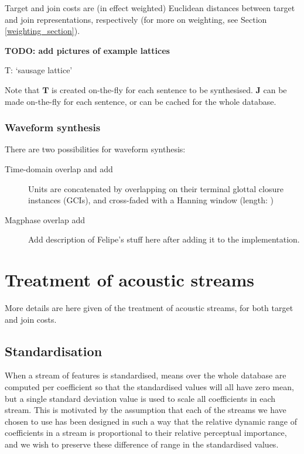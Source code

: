Target and join costs are (in effect weighted) Euclidean distances between target and join representations, respectively (for more on weighting, see Section \ref{weighting_section}).

\color{red}

\textbf{TODO: add pictures of example lattices}

T: `sausage lattice'

\color{black}

Note that $\bm{T}$ is created on-the-fly for each sentence to be synthesised. $\bm{J}$ can be made on-the-fly for each sentence, or can be cached for the whole database.

 
\subsubsection{Waveform synthesis}

There are two possibilities for waveform synthesis:

\begin{description}
    \item[Time-domain overlap and add] Units are concatenated by overlapping on their terminal glottal closure instances (GCIs), and cross-faded with a Hanning window (length: )
    \item[Magphase overlap add] \color{red} Add description of Felipe's stuff here after adding it to the implementation. \color{black}
\end{description}



\section{Treatment of acoustic streams} 

More details are here given of the treatment of acoustic streams, for both target and join costs. 

\subsection{Standardisation}\label{standardisation_section}

When a stream of features is standardised, means over the whole database are computed per coefficient so that the standardised values will all have zero mean, but a single standard deviation value is used to scale all coefficients in each stream. This is motivated by the assumption that each of the streams we have chosen to use has been designed in such a way that the relative dynamic range of coefficients in a stream is proportional to their relative perceptual importance, and we wish to preserve these difference of range in the standardised values. 

